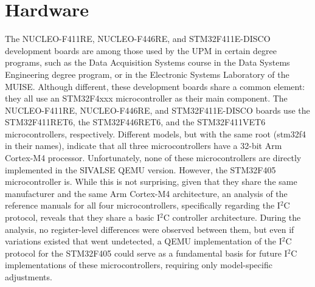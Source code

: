 \section{Hardware}
\label{chap:analysis_hardware}

The NUCLEO-F411RE, NUCLEO-F446RE, and STM32F411E-DISCO development 
boards are among those used by the UPM in certain degree programs, such as 
the Data Acquisition Systems course in the Data Systems Engineering degree 
program, or in the Electronic Systems Laboratory of the MUISE. Although different, 
these development boards share a common element: they all use an STM32F4xxx 
microcontroller as their main component. The NUCLEO-F411RE\cite{NUCLEOF411RE2026}, NUCLEO-F446RE\cite{NUCLEOF446RE2026}, 
and STM32F411E-DISCO\cite{STM32F411Discovery2026} boards use the STM32F411RET6\cite{STM32F411ReferenceManual2023}, the 
STM32F446RET6\cite{STM32F446ReferenceManual2023}, and the STM32F411VET6 microcontrollers, respectively. 
Different models, but with the same root (stm32f4 in their names), indicate that all 
three microcontrollers have a 32-bit Arm Cortex-M4 processor. Unfortunately, none 
of these microcontrollers are directly implemented in the SIVALSE QEMU version. 
However, the STM32F405 microcontroller is. While this is not surprising, given that 
they share the same manufacturer and the same Arm Cortex-M4 architecture, an 
analysis of the reference manuals for all four microcontrollers, specifically regarding 
the I$^2$C protocol, reveals that they share a basic I$^2$C controller architecture. 
During the analysis, no register-level differences were observed between them, but 
even if variations existed that went undetected, a QEMU implementation of the I$^2$C 
protocol for the STM32F405 could serve as a fundamental basis for future I$^2$C 
implementations of these microcontrollers, requiring only model-specific adjustments.





